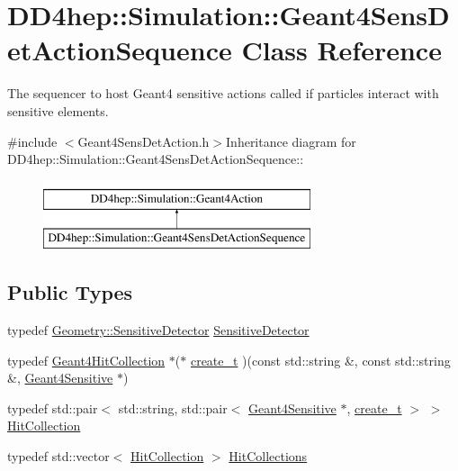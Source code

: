 \hypertarget{class_d_d4hep_1_1_simulation_1_1_geant4_sens_det_action_sequence}{
\section{DD4hep::Simulation::Geant4SensDetActionSequence Class Reference}
\label{class_d_d4hep_1_1_simulation_1_1_geant4_sens_det_action_sequence}
}


The sequencer to host Geant4 sensitive actions called if particles interact with sensitive elements.  


{\ttfamily \#include $<$Geant4SensDetAction.h$>$}Inheritance diagram for DD4hep::Simulation::Geant4SensDetActionSequence::\begin{figure}[H]
\begin{center}
\leavevmode
\includegraphics[height=2cm]{class_d_d4hep_1_1_simulation_1_1_geant4_sens_det_action_sequence}
\end{center}
\end{figure}
\subsection*{Public Types}
\begin{DoxyCompactItemize}
\item 
typedef \hyperlink{class_d_d4hep_1_1_geometry_1_1_sensitive_detector}{Geometry::SensitiveDetector} \hyperlink{class_d_d4hep_1_1_simulation_1_1_geant4_sens_det_action_sequence_a9d428afdc7b9189bce5dab4f16db17fb}{SensitiveDetector}
\item 
typedef \hyperlink{class_d_d4hep_1_1_simulation_1_1_geant4_hit_collection}{Geant4HitCollection} $\ast$($\ast$ \hyperlink{class_d_d4hep_1_1_simulation_1_1_geant4_sens_det_action_sequence_a81e56326a5a51cf3df62bfe60014b291}{create\_\-t} )(const std::string \&, const std::string \&, \hyperlink{class_d_d4hep_1_1_simulation_1_1_geant4_sensitive}{Geant4Sensitive} $\ast$)
\item 
typedef std::pair$<$ std::string, std::pair$<$ \hyperlink{class_d_d4hep_1_1_simulation_1_1_geant4_sensitive}{Geant4Sensitive} $\ast$, \hyperlink{class_d_d4hep_1_1_simulation_1_1_geant4_sens_det_action_sequence_a81e56326a5a51cf3df62bfe60014b291}{create\_\-t} $>$ $>$ \hyperlink{class_d_d4hep_1_1_simulation_1_1_geant4_sens_det_action_sequence_ac2b994581eab7aad3b5473ac416f65fd}{HitCollection}
\item 
typedef std::vector$<$ \hyperlink{class_d_d4hep_1_1_geometry_1_1_hit_collection}{HitCollection} $>$ \hyperlink{class_d_d4hep_1_1_simulation_1_1_geant4_sens_det_action_sequence_aabeb325e4b6af156cbae3578b00301b3}{HitCollections}
\end{DoxyCompactItemize}
